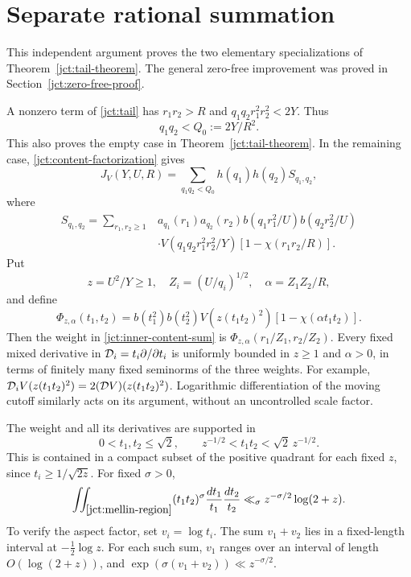 

\section{Separate rational summation}
This independent argument proves the two elementary specializations
of Theorem~\ref{jct:tail-theorem}. The general zero-free improvement
was proved in Section~\ref{jct:zero-free-proof}.

A nonzero term of \eqref{jct:tail} has \(r_1r_2>R\) and
\(q_1q_2r_1^2r_2^2<2Y\).  Thus
\begin{equation}
 q_1q_2<Q_0:=2Y/R^2.
 \label{jct:q-range}
\end{equation}
This also proves the empty case in Theorem~\ref{jct:tail-theorem}.
In the remaining case, \eqref{jct:content-factorization} gives
\begin{equation}
 J_V(Y,U,R)=\sum_{q_1q_2<Q_0}h(q_1)h(q_2)S_{q_1,q_2},
 \label{jct:decomposition}
\end{equation}
where
\begin{equation}
\begin{split}
 S_{q_1,q_2}=\sum_{r_1,r_2\ge1}&a_{q_1}(r_1)a_{q_2}(r_2)
 b(q_1r_1^2/U)b(q_2r_2^2/U)\\
 &\cdot V(q_1q_2r_1^2r_2^2/Y)[1-\chi(r_1r_2/R)].
 \label{jct:inner-content-sum}
\end{split}
\end{equation}
Put
\[
 z=U^2/Y\ge1,\quad Z_i=(U/q_i)^{1/2},\quad
 \alpha=Z_1Z_2/R,
\]
and define
\begin{equation}
 \Phi_{z,\alpha}(t_1,t_2)=b(t_1^2)b(t_2^2)
 V(z(t_1t_2)^2)[1-\chi(\alpha t_1t_2)].
 \label{jct:two-weight}
\end{equation}
Then the weight in \eqref{jct:inner-content-sum} is
\(\Phi_{z,\alpha}(r_1/Z_1,r_2/Z_2)\).
Every fixed mixed derivative in
\(\mathcal D_i=t_i\partial/\partial t_i\) is uniformly bounded in
\(z\ge1\) and \(\alpha>0\), in terms of finitely many fixed
seminorms of the three weights.  For example,
\(\mathcal D_i V(z(t_1t_2)^2)=2(\mathcal D V)(z(t_1t_2)^2)\).
Logarithmic differentiation of the moving cutoff similarly
acts on its argument, without an uncontrolled scale factor.

The weight and all its derivatives are supported in
\begin{equation}
 0<t_1,t_2\le\sqrt2,\qquad
 z^{-1/2}<t_1t_2<\sqrt2\,z^{-1/2}.
 \label{jct:mellin-region}
\end{equation}
This is contained in a compact subset of the positive quadrant
for each fixed \(z\), since \(t_i\ge1/\sqrt{2z}\).
For fixed \(\sigma>0\),
\begin{equation}
 \iint_{\eqref{jct:mellin-region}}
 (t_1t_2)^\sigma\frac{dt_1}{t_1}\frac{dt_2}{t_2}
 \ll_\sigma z^{-\sigma/2}\log(2+z).
 \label{jct:aspect}
\end{equation}
To verify the aspect factor, set \(v_i=\log t_i\).
The sum \(v_1+v_2\) lies in a fixed-length interval at
\(-\tfrac12\log z\).  For each such sum, \(v_1\) ranges
over an interval of length \(O(\log(2+z))\), and
\(\exp(\sigma(v_1+v_2))\ll z^{-\sigma/2}\).

